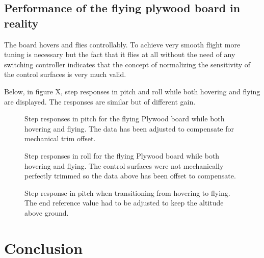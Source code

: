 \documentclass{article}
\begin{document}
\subsection{Performance of the flying plywood board in reality}
The board hovers and flies controllably.
To achieve very smooth flight more tuning is necessary but the fact that it flies at all without the need of any switching controller indicates that the concept of normalizing the sensitivity of the control surfaces is very much valid.

Below, in figure X, step responses in pitch and roll while both hovering and flying are displayed.
The responses are similar but of different gain.


\begin{figure}[]
    \centering
    
    \caption{Step responses in pitch for the flying Plywood board while both hovering and flying. The data has been adjusted to compensate for mechanical trim offset.}
    \label{airplane}
\end{figure}

\begin{figure}[]
    
    \caption{Step responses in roll for the flying Plywood board while both hovering and flying. The control surfaces were not mechanically perfectly trimmed so the data above has been offset to compensate.}
    \label{airplane}
\end{figure}

\begin{figure}[]
    
    \caption{Step response in pitch when transitioning from hovering to flying. The end reference value had to be adjusted to keep the altitude above ground.}
    \label{airplane}
\end{figure}



\section{Conclusion}

\newpage
\end{document}
